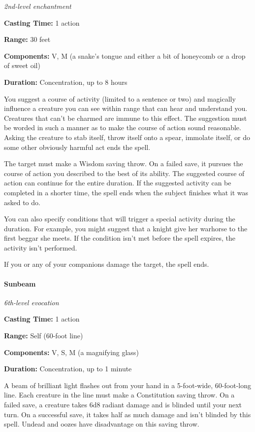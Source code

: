 \documentclass[
]{article}
\begin{document}
\emph{2nd-level enchantment}

\textbf{Casting Time:} 1 action

\textbf{Range:} 30 feet

\textbf{Components:} V, M (a snake's tongue and either a bit of
honeycomb or a drop of sweet oil)

\textbf{Duration:} Concentration, up to 8 hours

You suggest a course of activity (limited to a sentence or two) and
magically influence a creature you can see within range that can hear
and understand you. Creatures that can't be charmed are immune to this
effect. The suggestion must be worded in such a manner as to make the
course of action sound reasonable. Asking the creature to stab itself,
throw itself onto a spear, immolate itself, or do some other obviously
harmful act ends the spell.

The target must make a Wisdom saving throw. On a failed save, it pursues
the course of action you described to the best of its ability. The
suggested course of action can continue for the entire duration. If the
suggested activity can be completed in a shorter time, the spell ends
when the subject finishes what it was asked to do.

You can also specify conditions that will trigger a special activity
during the duration. For example, you might suggest that a knight give
her warhorse to the first beggar she meets. If the condition isn't met
before the spell expires, the activity isn't performed.

If you or any of your companions damage the target, the spell ends.

\hypertarget{sunbeam}{%
\paragraph{Sunbeam}\label{sunbeam}}

\emph{6th-level evocation}

\textbf{Casting Time:} 1 action

\textbf{Range:} Self (60-foot line)

\textbf{Components:} V, S, M (a magnifying glass)

\textbf{Duration:} Concentration, up to 1 minute

A beam of brilliant light flashes out from your hand in a 5-foot-wide,
60-foot-long line. Each creature in the line must make a Constitution
saving throw. On a failed save, a creature takes 6d8 radiant damage and
is blinded until your next turn. On a successful save, it takes half as
much damage and isn't blinded by this spell. Undead and oozes have
disadvantage on this saving throw.
\end{document}

